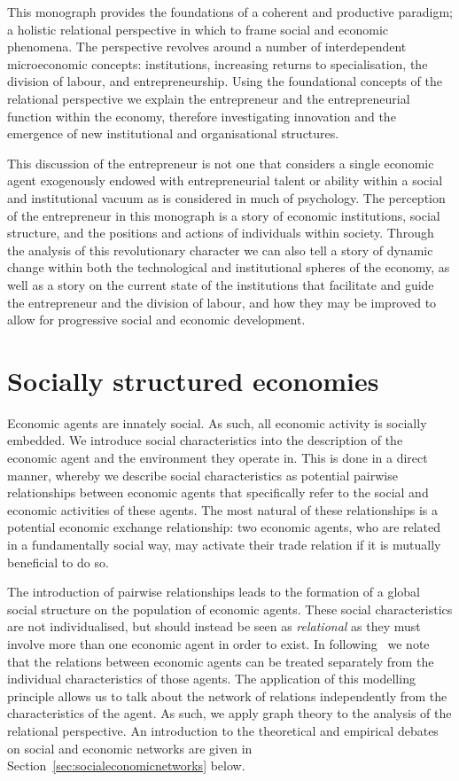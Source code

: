 \medskip \noindent This monograph provides the foundations of a coherent and productive paradigm; a holistic relational perspective in which to frame social and economic phenomena. The perspective revolves around a number of interdependent microeconomic concepts: institutions, increasing returns to specialisation, the division of labour, and entrepreneurship. Using the foundational concepts of the relational perspective we explain the entrepreneur and the entrepreneurial function within the economy, therefore investigating innovation and the emergence of new institutional and organisational structures.

This discussion of the entrepreneur is not one that considers a single economic agent exogenously endowed with entrepreneurial talent or ability within a social and institutional vacuum as is considered in much of psychology. The perception of the entrepreneur in this monograph is a story of economic institutions, social structure, and the positions and actions of individuals within society. Through the analysis of this revolutionary character we can also tell a story of dynamic change within both the technological and institutional spheres of the economy, as well as a story on the current state of the institutions that facilitate and guide the entrepreneur and the division of labour, and how they may be improved to allow for progressive social and economic development.

\section{Socially structured economies}

Economic agents are innately social. As such, all economic activity is socially embedded. We introduce social characteristics into the description of the economic agent and the environment they operate in. This is done in a direct manner, whereby we describe social characteristics as potential pairwise relationships between economic agents that specifically refer to the social and economic activities of these agents. The most natural of these relationships is a potential economic exchange relationship: two economic agents, who are related in a fundamentally social way, may activate their trade relation if it is mutually beneficial to do so.

The introduction of pairwise relationships leads to the formation of a global social structure on the population of economic agents. These social characteristics are not individualised, but should instead be seen as \emph{relational} as they must involve more than one economic agent in order to exist. In following~\citep{Gilles1990} we note that the relations between economic agents can be treated separately from the individual characteristics of those agents. The application of this modelling principle allows us to talk about the network of relations independently from the characteristics of the agent. As such, we apply graph theory to the analysis of the relational perspective. An introduction to the theoretical and empirical debates on social and economic networks are given in Section~\ref{sec:socialeconomicnetworks} below.

